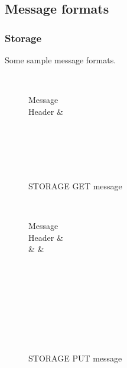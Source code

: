 \documentclass[a4paper, 11pt]{article}
\begin{document}
\subsection*{Message formats}

\subsubsection*{Storage}

Some sample message formats.

\begin{figure}[h!]
	\centering
	\begin{bytefield}[bitwidth=0.8em]{32}
		 \\
		\begin{rightwordgroup}{Message \\  Header}
			 & 
		\end{rightwordgroup} \\
		 \\
		\skippedwords \\
		 \\
	\end{bytefield}
	\caption{STORAGE GET message}
	\label{STORAGEGET}
\end{figure}

\begin{figure}[h!]
	\centering
	\begin{bytefield}[bitwidth=0.8em]{32}
		 \\
		\begin{rightwordgroup}{Message \\  Header}
			 &  \\
			 &  & 
		\end{rightwordgroup} \\
		 \\
		\skippedwords \\
		 \\
		 \\
		\skippedwords \\
		 \\
	\end{bytefield}
	\caption{STORAGE PUT message}
	\label{STORAGEPUT}
\end{figure}
\end{document}

